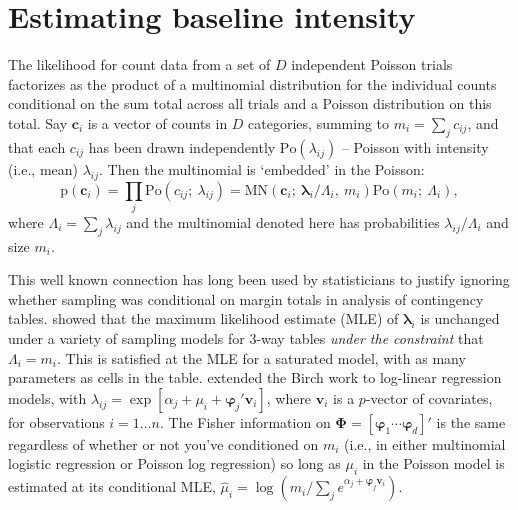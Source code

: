\documentclass[12pt]{article}
\newcommand{\bs}[1]{\boldsymbol{#1}}
\newcommand{\mr}[1]{\mathrm{#1}}
\newcommand{\bm}[1]{\mathbf{#1}}
\begin{document}
\section{Estimating baseline intensity}
\label{MU}

The likelihood for count data from a set of $D$ independent Poisson trials
factorizes as the product of a multinomial distribution for the individual
counts conditional on the sum total across all trials and a Poisson
distribution on this total.  Say $\bm{c}_i$ is a vector of counts in $D$
categories, summing to $m_i = \sum_j c_{ij}$, and that each $c_{ij}$ has
been drawn independently $\mr{Po}\left(\lambda_{ij}\right)$ -- Poisson with
intensity (i.e., mean) $\lambda_{ij}$. Then the multinomial is `embedded' in
the Poisson: \begin{equation}\label{embed} \mr{p}(\bm{c}_{i}) = \prod_j
\mr{Po}\left(c_{ij};~\lambda_{ij}\right) =
\mr{MN}\left(\bm{c}_i;~\bs{\lambda}_{i}/\Lambda_i,
~m_i\right)\mr{Po}\left(m_i;~\Lambda_i\right), \end{equation} where $\Lambda_i
= \sum_j \lambda_{ij}$ and the multinomial denoted here has probabilities
$\lambda_{ij}/\Lambda_i$ and size $m_i$.

This well known connection has long been used by statisticians to justify
ignoring whether sampling was conditional on margin totals in analysis of
contingency tables. \cite{birch_maximum_1963} showed that the maximum
likelihood estimate (MLE) of $\bs{\lambda}_i$ is unchanged under a variety of
sampling models for 3-way tables {\it under the constraint} that $\Lambda_{i}
= m_i$. This is satisfied at the MLE for a saturated model, with as many
parameters as cells in the table. \cite{palmgren_fisher_1981} extended the
Birch work to log-linear regression models, with $\lambda_{ij} = \exp[\alpha_j
+ \mu_i + \bs{\varphi}_j'\bm{v}_i]$, where $\bm{v}_i$ is a $p$-vector of
covariates, for observations $i=1\ldots n$. The Fisher information on
$\bs{\Phi} = [\bs{\varphi}_1 \cdots \bs{\varphi}_d]'$ is the same regardless
of whether or not you've conditioned on $m_i$ (i.e., in either multinomial
logistic regression or Poisson log regression) so long as $\mu_i$ in the
Poisson model is estimated at its conditional MLE, $\hat \mu_i =
\log\left(m_i/\sum_j e^{\alpha_j + \bs{\varphi}_j\bm{v}_i}\right)$.
\end{document}
